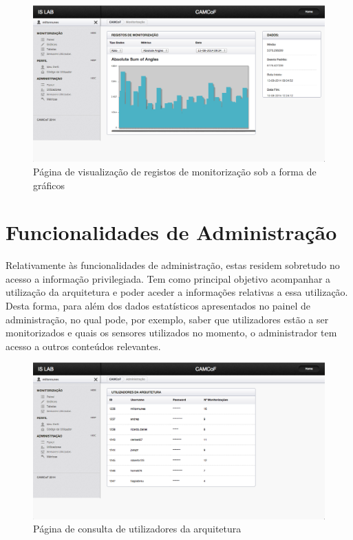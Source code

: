  \begin{figure}[htb]
   \centering
   \includegraphics[scale=0.29]{Images/graphs.png}
   \caption{Página de visualização de registos de monitorização sob a forma de gráficos}
\end{figure}


\section{Funcionalidades de Administração}

Relativamente às funcionalidades de administração, estas residem sobretudo no acesso a informação privilegiada. Tem como principal objetivo acompanhar a utilização da arquitetura e poder aceder a informações relativas a essa utilização. Desta forma, para além dos dados estatísticos apresentados no painel de administração, no qual pode, por exemplo, saber que utilizadores estão a ser monitorizados e quais os sensores utilizados no momento, o administrador tem acesso a outros conteúdos relevantes.

\begin{figure}[htb]
   \centering
   \includegraphics[scale=0.29]{Images/users.png}
   \caption{Página de consulta de utilizadores da arquitetura}
\end{figure}

